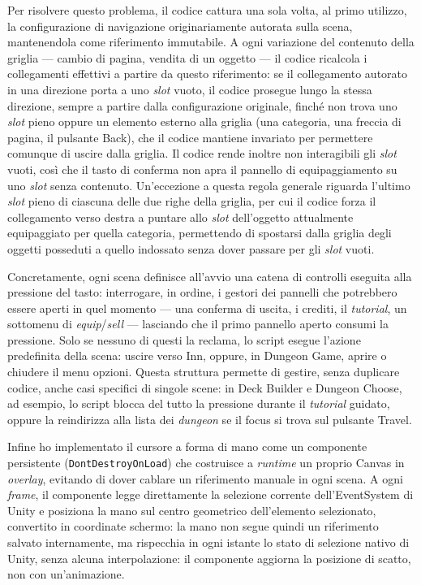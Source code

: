 Per risolvere questo problema, il codice cattura una sola volta, al primo utilizzo, la configurazione di navigazione originariamente autorata sulla scena, mantenendola come riferimento immutabile. A ogni variazione del contenuto della griglia — cambio di pagina, vendita di un oggetto — il codice ricalcola i collegamenti effettivi a partire da questo riferimento: se il collegamento autorato in una direzione porta a uno \textit{slot} vuoto, il codice prosegue lungo la stessa direzione, sempre a partire dalla configurazione originale, finché non trova uno \textit{slot} pieno oppure un elemento esterno alla griglia (una categoria, una freccia di pagina, il pulsante Back), che il codice mantiene invariato per permettere comunque di uscire dalla griglia. Il codice rende inoltre non interagibili gli \textit{slot} vuoti, così che il tasto di conferma non apra il pannello di equipaggiamento su uno \textit{slot} senza contenuto. Un'eccezione a questa regola generale riguarda l'ultimo \textit{slot} pieno di ciascuna delle due righe della griglia, per cui il codice forza il collegamento verso destra a puntare allo \textit{slot} dell'oggetto attualmente equipaggiato per quella categoria, permettendo di spostarsi dalla griglia degli oggetti posseduti a quello indossato senza dover passare per gli \textit{slot} vuoti.
 
Concretamente, ogni scena definisce all'avvio una catena di controlli eseguita alla pressione del tasto: interrogare, in ordine, i gestori dei pannelli che potrebbero essere aperti in quel momento — una conferma di uscita, i crediti, il \textit{tutorial}, un sottomenu di \textit{equip}/\textit{sell} — lasciando che il primo pannello aperto consumi la pressione. Solo se nessuno di questi la reclama, lo script esegue l'azione predefinita della scena: uscire verso Inn, oppure, in Dungeon Game, aprire o chiudere il menu opzioni. Questa struttura permette di gestire, senza duplicare codice, anche casi specifici di singole scene: in Deck Builder e Dungeon Choose, ad esempio, lo script blocca del tutto la pressione durante il \textit{tutorial} guidato, oppure la reindirizza alla lista dei \textit{dungeon} se il focus si trova sul pulsante Travel.
 
Infine ho implementato il cursore a forma di mano come un componente persistente (\texttt{DontDestroyOnLoad}) che costruisce a \textit{runtime} un proprio Canvas in \textit{overlay}, evitando di dover cablare un riferimento manuale in ogni scena. A ogni \textit{frame}, il componente legge direttamente la selezione corrente dell'EventSystem di Unity e posiziona la mano sul centro geometrico dell'elemento selezionato, convertito in coordinate schermo: la mano non segue quindi un riferimento salvato internamente, ma rispecchia in ogni istante lo stato di selezione nativo di Unity, senza alcuna interpolazione: il componente aggiorna la posizione di scatto, non con un'animazione.
 
